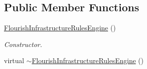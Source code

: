 \subsection*{Public Member Functions}
\begin{DoxyCompactItemize}
\item 
\hyperlink{classFlourishInfrastructureRulesEngine_a9c3c573610fdc22a6c0b1f3c04ba1b52}{Flourish\+Infrastructure\+Rules\+Engine} ()
\begin{DoxyCompactList}\small\item\em Constructor. \end{DoxyCompactList}\item 
virtual \hyperlink{classFlourishInfrastructureRulesEngine_a1ff66470d788e23861ae6a3b177fb0a5}{$\sim$\+Flourish\+Infrastructure\+Rules\+Engine} ()\hypertarget{classFlourishInfrastructureRulesEngine_a1ff66470d788e23861ae6a3b177fb0a5}{}\label{classFlourishInfrastructureRulesEngine_a1ff66470d788e23861ae6a3b177fb0a5}


\end{DoxyCompactItemize}
